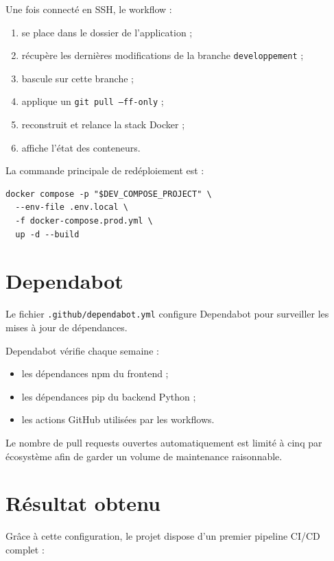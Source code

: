 \documentclass[11pt,a4paper]{article}
\begin{document}
Une fois connecté en SSH, le workflow :

\begin{enumerate}
  \item se place dans le dossier de l'application ;
  \item récupère les dernières modifications de la branche \texttt{developpement} ;
  \item bascule sur cette branche ;
  \item applique un \texttt{git pull --ff-only} ;
  \item reconstruit et relance la stack Docker ;
  \item affiche l'état des conteneurs.
\end{enumerate}

La commande principale de redéploiement est :

\begin{lstlisting}
docker compose -p "$DEV_COMPOSE_PROJECT" \
  --env-file .env.local \
  -f docker-compose.prod.yml \
  up -d --build
\end{lstlisting}

\section{Dependabot}

Le fichier \texttt{.github/dependabot.yml} configure Dependabot pour surveiller
les mises à jour de dépendances.

Dependabot vérifie chaque semaine :

\begin{itemize}
  \item les dépendances npm du frontend ;
  \item les dépendances pip du backend Python ;
  \item les actions GitHub utilisées par les workflows.
\end{itemize}

Le nombre de pull requests ouvertes automatiquement est limité à cinq par
écosystème afin de garder un volume de maintenance raisonnable.

\section{Résultat obtenu}

Grâce à cette configuration, le projet dispose d'un premier pipeline CI/CD
complet :
\end{document}
